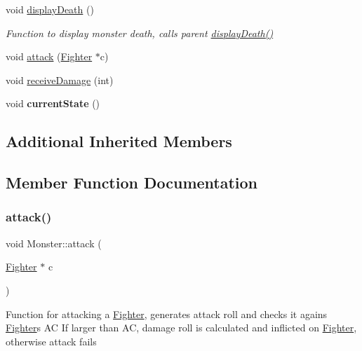 \begin{DoxyCompactItemize}
\hypertarget{class_monster_a9ef924b193478c29baa90b0fa5845711}{}\label{class_monster_a9ef924b193478c29baa90b0fa5845711} 
void \hyperlink{class_monster_a9ef924b193478c29baa90b0fa5845711}{display\+Death} ()
\begin{DoxyCompactList}\small\item\em Function to display monster death, calls parent \hyperlink{class_monster_a9ef924b193478c29baa90b0fa5845711}{display\+Death()} \end{DoxyCompactList}\item 
void \hyperlink{class_monster_ad1805087dbd4472ace66a45f053aa250}{attack} (\hyperlink{class_fighter}{Fighter} $\ast$c)
\item 
void \hyperlink{class_monster_a8a0aadbb74bed6181adb79b58d67d0a8}{receive\+Damage} (int)
\item 
\hypertarget{class_monster_a2e5fc90efefa02d77c3645f6c7768d88}{}\label{class_monster_a2e5fc90efefa02d77c3645f6c7768d88} 
void {\bfseries current\+State} ()
\end{DoxyCompactItemize}
\subsection*{Additional Inherited Members}


\subsection{Member Function Documentation}
\hypertarget{class_monster_ad1805087dbd4472ace66a45f053aa250}{}\label{class_monster_ad1805087dbd4472ace66a45f053aa250} 
\subsubsection{\texorpdfstring{attack()}{attack()}}
{\footnotesize\ttfamily void Monster\+::attack (\begin{DoxyParamCaption}\item[{\hyperlink{class_fighter}{Fighter} $\ast$}]{c }\end{DoxyParamCaption})}

Function for attacking a \hyperlink{class_fighter}{Fighter}, generates attack roll and checks it agains \hyperlink{class_fighter}{Fighter}\textquotesingle{}s AC If larger than AC, damage roll is calculated and inflicted on \hyperlink{class_fighter}{Fighter}, otherwise attack fails \hypertarget{class_monster_a8a0aadbb74bed6181adb79b58d67d0a8}{}\label{class_monster_a8a0aadbb74bed6181adb79b58d67d0a8} 
